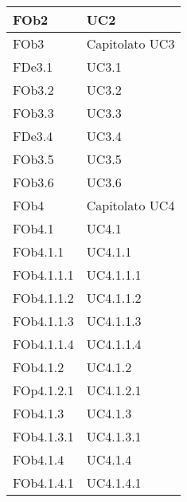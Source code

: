 \begin{longtable}{|l|p{4cm}|}
\hline
FOb2 & UC2 \linebreak \\ 
\hline
FOb3 & Capitolato \linebreak UC3 \linebreak \\ 
\hline
FDe3.1 & UC3.1 \linebreak  \\ 
\hline
FOb3.2 & UC3.2 \linebreak  \\ 
\hline
FOb3.3 & UC3.3 \linebreak  \\ 
\hline
FDe3.4 & UC3.4 \linebreak  \\ 
\hline
FOb3.5 & UC3.5 \linebreak  \\ 
\hline
FOb3.6 & UC3.6 \linebreak  \\ 
\hline
FOb4 & Capitolato \linebreak UC4 \linebreak \\ 
\hline
FOb4.1 & UC4.1 \linebreak  \\ 
\hline
FOb4.1.1 & UC4.1.1 \linebreak  \\ 
\hline
FOb4.1.1.1 & UC4.1.1.1 \linebreak  \\ 
\hline
FOb4.1.1.2 & UC4.1.1.2 \linebreak  \\ 
\hline
FOb4.1.1.3 & UC4.1.1.3 \linebreak  \\ 
\hline
FOb4.1.1.4 & UC4.1.1.4 \linebreak  \\ 
\hline
FOb4.1.2 & UC4.1.2 \linebreak  \\ 
\hline
FOp4.1.2.1 & UC4.1.2.1 \linebreak  \\ 
\hline
FOb4.1.3 & UC4.1.3 \linebreak  \\ 
\hline
FOb4.1.3.1 & UC4.1.3.1 \linebreak  \\ 
\hline
FOb4.1.4 & UC4.1.4 \linebreak  \\ 
\hline
FOb4.1.4.1 & UC4.1.4.1 \linebreak  \\ 

\end{longtable}
